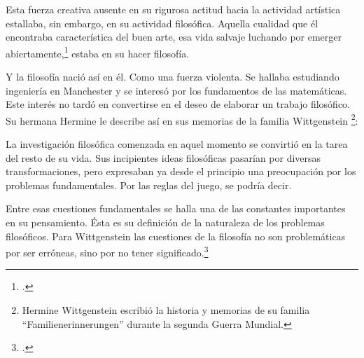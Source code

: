 Esta fuerza creativa ausente en su rigurosa actitud hacia la actividad artística
estallaba, sin embargo, en su actividad filosófica. Aquella cualidad que él
encontraba característica del buen arte, esa vida salvaje luchando por emerger
abiertamente,\footcite[cf.˜][loc.˜]{monk} estaba en su hacer filosofía.


Y la filosofía nació así en él. Como una fuerza violenta. Se hallaba estudiando
ingeniería en Manchester y se interesó por los fundamentos de las matemáticas.
Este interés no tardó en convertirse en el deseo de elaborar un trabajo
filosófico. Su hermana Hermine le describe así en sus memorias de la familia
Wittgenstein
\footnote{Hermine Wittgenstein escribió la historia y memorias de su familia
  ``Familienerinnerungen'' durante la segunda Guerra Mundial.}:

La investigación filosófica comenzada en aquel momento se convirtió en la tarea
del resto de su vida. Sus incipientes ideas filosóficas pasarían por diversas
transformaciones, pero expresaban ya desde el principio una preocupación por los
problemas fundamentales. Por las reglas del juego, se podría decir.


Entre esas cuestiones fundamentales se halla una de las constantes importantes
en su pensamiento. Ésta es su definición de la naturaleza de los problemas
filosóficos. Para Wittgenstein las cuestiones de la filosofía no son
problemáticas por ser erróneas, sino por no tener
significado.\footcite[cf.~][4.003]{tractatus}

